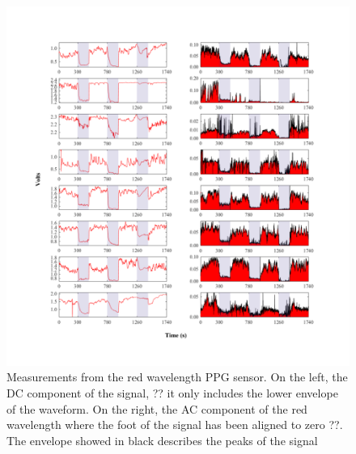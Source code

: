 \begin{figure}[!htbp]
	\centering
	\includegraphics[width=\textwidth,keepaspectratio,trim={1cm 0cm 0cm 0 cm},clip]{figure18}    
	\caption[PPG red wavelength measurments AC and DC components]{Measurements from the red wavelength PPG sensor. On the left, the DC component of the signal, ?? it only includes the lower envelope of the waveform. On the right, the AC component of the red wavelength where the foot of the signal has been aligned to zero ??. The envelope showed in black describes the peaks of the signal}
	\label{fig:RED_PPG}
\end{figure}

